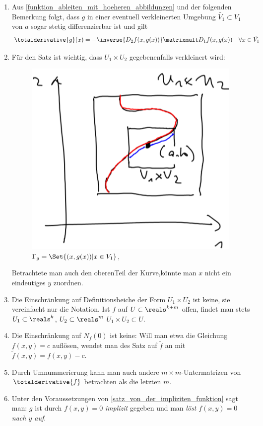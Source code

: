 \begin{bemerkungen*}
  \begin{enumerate}
    \item \label{implizite_funktion_auf_umgebung_stetig_differenzierbar} Aus \ref{funktion_ableiten_mit_hoeheren_abbildungen} und der folgenden Bemerkung folgt, dass \( g \) in einer eventuell verkleinerten Umgebung \( \tilde{V_1}\subset V_1 \) von \( a \) sogar stetig differenzierbar ist und gilt
    \begin{equation*}
      \totalderivative{g}(x)=-\inverse{D_2 f(x,g(x))}\matrixmult D_1f(x,g(x))\quad \forall x\in \tilde{V_1}
    \end{equation*}
    \item Für den Satz ist wichtig, dass \( U_1\times U_2 \) gegebenenfalls verkleinert wird:
    \begin{figure}[H]
      \centering
      \includegraphics[width=0.5\linewidth]{figures/verkleinerter_definitionsbereich_implizite_funktion}
      \caption*{\textcolor{Blue}{\( \Gamma_g=\Set{(x,g(x))|x\in V_1} \)},\textcolor{Red}{}}
      \label{fig:verkleinerter_definitionsbereich_implizite_funktion}
    \end{figure}
    Betrachtete man auch den oberenTeil der Kurve,könnte man \( x \) nicht ein eindeutiges \( y \) zuordnen.
    \item Die Einschränkung auf Definitionsbeiche der Form \( U_1\times U_2  \) ist keine, sie vereinfacht nur die Notation. Ist \( f \) auf \( U\subset \reals^{k+m} \) offen, findet man stets \( U_1\subset \reals^k \), \( U_2\subset \reals^m \) \sd \( U_1\times U_2\subset U \).
    \item Die Einschränkung auf \( N_f(0) \) ist keine: Will man etwa die Gleichung \( f(x,y)=c \) auflösen, wendet man des Satz auf \( \tilde{f} \) an mit \( \tilde{f}(x,y)=f(x,y)-c \).
    \item Durch Umnummerierung kann man auch andere \( m\times m \)-Untermatrizen von \( \totalderivative{f} \) betrachten als die letzten \( m \).
    \item Unter den Voraussetzungen von \ref{satz_von_der_impliziten_funktion} sagt man: \( g \) ist durch \( f(x,y)=0 \) \emph{implizit} gegeben und man \emph{löst} \( f(x,y)=0 \) \emph{nach \( y \) auf}.
  \end{enumerate}
\end{bemerkungen*}
